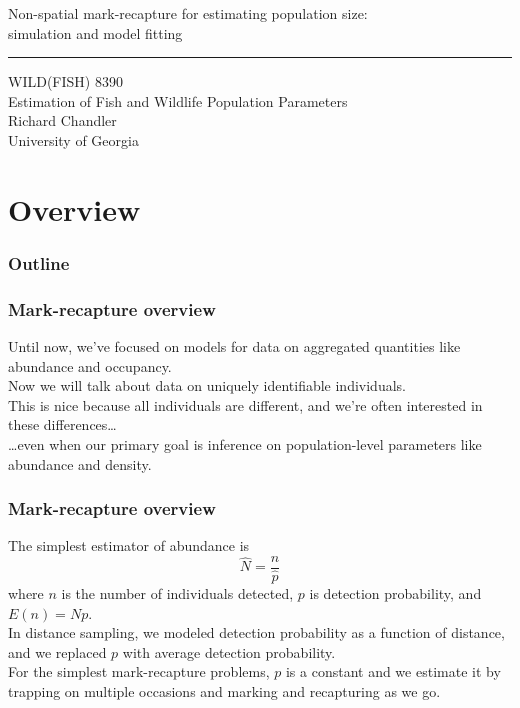 \documentclass[color=usenames,dvipsnames]{beamer}\usepackage[]{graphicx}\usepackage[]{color}
\begin{document}
\begin{frame}[plain]
  \LARGE
  \centering
  {
    \LARGE %
    Non-spatial mark-recapture for estimating
    population size: \\
    \Large simulation and model fitting \\
  }
  {\color{default} \rule{\textwidth}{0.1pt} }
  \vfill
  \large
  WILD(FISH) 8390 \\
  Estimation of Fish and Wildlife Population Parameters \\
  \vfill
  \large
  Richard Chandler \\
  University of Georgia \\
\end{frame}






\section{Overview}



\begin{frame}[plain]
  \frametitle{Outline}
  \Large
\end{frame}



\begin{frame}
  \frametitle{Mark-recapture overview}
  Until now, we've focused on models for data on aggregated quantities
  like abundance and occupancy. \\ 
  \pause
  \vfill
  Now we will talk about data on uniquely identifiable individuals. \\
  \pause
  \vfill
  This is nice because all individuals are different, and we're often
  interested in these differences\dots \\
  \pause
  \vfill
  \dots even when our primary goal is
  inference on population-level parameters like abundance
  and density. \\
\end{frame}



\begin{frame}
  \frametitle{Mark-recapture overview}
  The simplest estimator of abundance is 
  \[
    \hat{N} = \frac{n}{\hat{p}}
  \]
  where $n$ is the number of individuals detected, $p$ is detection
  probability, and $E(n)=Np$. \\
  \pause
  \vfill
  In distance sampling, we modeled detection probability as a
  function of distance, and we replaced $p$ with average detection
  probability. \\ 
  \pause
  \vfill
  For the simplest mark-recapture problems, $p$ is a constant and we
  estimate it by trapping on multiple occasions and marking and
  recapturing as we go.  
\end{frame}
\end{document}
